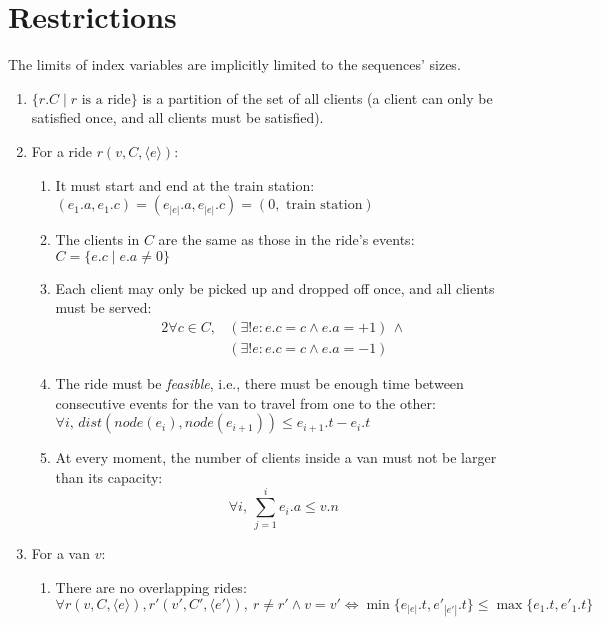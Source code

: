 \section{Restrictions} \label{problem-formalization-restrictions}
The limits of index variables are implicitly limited to the sequences' sizes.
\begin{enumerate}
    \item $\{r.C \mid r \text{ is a ride}\}$ is a partition of the set of all clients (a client can only be satisfied once, and all clients must be satisfied).
    \item For a ride $r(v,C,\langle e \rangle)$:
    \begin{enumerate}
        \item It must start and end at the train station: $(e_1.a, e_1.c) = (e_{|e|}.a,e_{|e|}.c)=(0, \text{ train station})$
        \item The clients in $C$ are the same as those in the ride's events: $C=\{e.c \mid e.a \neq 0\}$
        \item Each client may only be picked up and dropped off once, and all clients must be served:
        \begin{alignat*}{2}
            \forall c \in C,
            &(\exists !e: e.c = c \wedge e.a = +1)\,\wedge \\
            &(\exists !e: e.c = c \wedge e.a = -1)
        \end{alignat*}
        \item The ride must be \emph{feasible}, i.e., there must be enough time between consecutive events for the van to travel from one to the other: $\forall i,\,dist(node(e_i), node(e_{i+1})) \leq e_{i+1}.t - e_i.t$
        \item At every moment, the number of clients inside a van must not be larger than its capacity:
        \begin{equation*}
            \forall i,~\sum_{j=1}^{i}{e_i.a} \leq v.n
        \end{equation*}
    \end{enumerate}
    \item For a van $v$:
    \begin{enumerate}
        \item \label{itm:van-restriction} There are no overlapping rides:
        \begin{equation*}
            \forall r(v,C,\langle e \rangle), r'(v',C',\langle e' \rangle),~r \neq r' \wedge v = v' \iff \min\{e_{|e|}.t,e'_{|e'|}.t\} \leq \max\{e_1.t,e'_1.t\}
        \end{equation*}
    \end{enumerate}
\end{enumerate}
